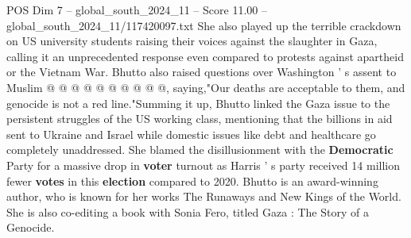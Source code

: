 \begin{textsample}{POS Dim 7 – global\_south\_2024\_11 – Score 11.00 – global\_south\_2024\_11/117420097.txt}
She also played up the terrible crackdown on US university students raising their voices against the slaughter in Gaza, calling it an unprecedented response even compared to protests against apartheid or the Vietnam War.
Bhutto also raised questions over Washington ' s assent to Muslim @ @ @ @ @ @ @ @ @ @, saying,"Our deaths are acceptable to them, and genocide is not a red line."Summing it up, Bhutto linked the Gaza issue to the persistent struggles of the US working class, mentioning that the billions in aid sent to Ukraine and Israel while domestic issues like debt and healthcare go completely unaddressed.
She blamed the disillusionment with the \textbf{Democratic} Party for a massive drop in \textbf{voter} turnout as Harris ' s party received 14 million fewer \textbf{votes} in this \textbf{election} compared to 2020.
Bhutto is an award-winning author, who is known for her works The Runaways and New Kings of the World.
She is also co-editing a book with Sonia Fero, titled Gaza : The Story of a Genocide.

\end{textsample}
